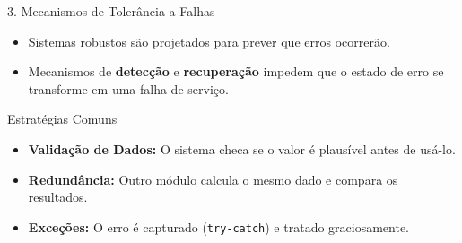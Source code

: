 \documentclass[9pt]{beamer}
\begin{document}
\begin{frame}{3. Mecanismos de Tolerância a Falhas}
  \begin{itemize}
    \item Sistemas robustos são projetados para prever que erros ocorrerão.
    \item Mecanismos de \textbf{detecção} e \textbf{recuperação} impedem que o estado de erro se transforme em uma falha de serviço.
  \end{itemize}



  \begin{block}{Estratégias Comuns}
    \begin{itemize}
        \item \textbf{Validação de Dados:} O sistema checa se o valor é plausível antes de usá-lo.
        \item \textbf{Redundância:} Outro módulo calcula o mesmo dado e compara os resultados.
        \item \textbf{Exceções:} O erro é capturado (\texttt{try-catch}) e tratado graciosamente.
    \end{itemize}
  \end{block}
\end{frame}
\end{document}
